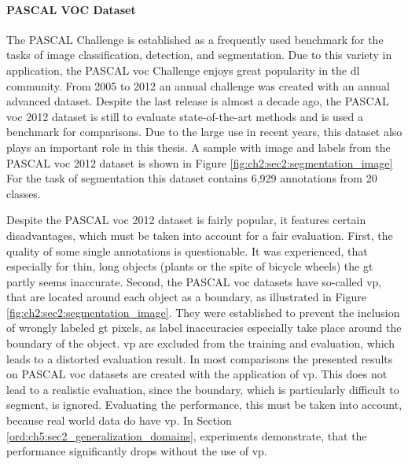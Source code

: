 \paragraph{PASCAL VOC Dataset}

The PASCAL  Challenge \cite{Eve20-PascalVOC} is established as a frequently used benchmark for the tasks of image classification, detection, and segmentation.
Due to this variety in application, the PASCAL \gls{voc} Challenge enjoys great popularity in the \gls{dl} community.
From 2005 to 2012 an annual challenge was created with an annual advanced dataset.
Despite the last release is almost a decade ago, the PASCAL \gls{voc} 2012 dataset is still to evaluate state-of-the-art methods and is used a benchmark for comparisons.
Due to the large use in recent years, this dataset also plays an important role in this thesis.
A sample with image and labels from the PASCAL \gls{voc} 2012 dataset is shown in Figure \ref{fig:ch2:sec2:segmentation_image}
For the task of segmentation this dataset contains 6,929 annotations from 20 classes.

Despite the PASCAL \gls{voc} 2012 dataset is fairly popular, it features certain disadvantages, which must be taken into account for a fair evaluation.
First, the quality of some single annotations is questionable.
It was experienced, that especially for thin, long objects (\eg plants or the spite of bicycle wheels) the \gls{gt} partly seems inaccurate.
Second, the PASCAL \gls{voc} datasets have so-called \gls{vp}, that are located around each object as a boundary, as illustrated in Figure \ref{fig:ch2:sec2:segmentation_image}.
They were established to prevent the inclusion of wrongly labeled \gls{gt} pixels, as label inaccuracies especially take place around the boundary of the object.  
\gls{vp} are excluded from the training and evaluation, which leads to a distorted evaluation result.
In most comparisons the presented results on PASCAL \gls{voc} datasets are created with the application of \gls{vp}.
This does not lead to a realistic evaluation, since the boundary, which is particularly difficult to segment, is ignored.
Evaluating the performance, this must be taken into account, because real world data do have \gls{vp}. 
In Section \ref{ord:ch5:sec2_generalization_domains}, experiments demonstrate, that the performance significantly drops without the use of \gls{vp}.


